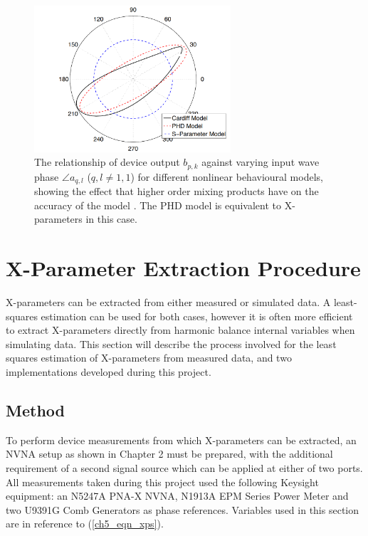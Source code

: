 \documentclass[../thesis/thesis.tex]{subfiles}
\begin{document}
\begin{figure}
	\centering
	\includegraphics[width=0.65\textwidth]{phasedep}
	\caption[Relationship of device output against input wave phase for different nonlinear behavioural models.]{The relationship of device output $b_{p,k}$ against varying input wave phase $\angle a_{q,l}$ ($q, l \ne 1, 1$) for different nonlinear behavioural models, showing the effect that higher order mixing products have on the accuracy of the model \cite{Bespalko_2016}. The PHD model is equivalent to X-parameters in this case.}
	\label{ch5_fig_phasedep}
\end{figure}

\section{X-Parameter Extraction Procedure}

X-parameters can be extracted from either measured or simulated data. A least-squares estimation can be used for both cases, however it is often more efficient to extract X-parameters directly from harmonic balance internal variables when simulating data. This section will describe the process involved for the least squares estimation of X-parameters from measured data, and two implementations developed during this project.

\subsection{Method}

To perform device measurements from which X-parameters can be extracted, an NVNA setup as shown in Chapter 2 must be prepared, with the additional requirement of a second signal source which can be applied at either of two ports. All measurements taken during this project used the following Keysight equipment: an N5247A PNA-X NVNA, N1913A EPM Series Power Meter and two U9391G Comb Generators as phase references. Variables used in this section are in reference to (\ref{ch5_eqn_xps}).
\end{document}
